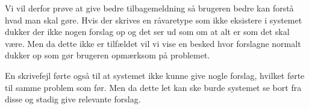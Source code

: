 Vi vil derfor prøve at give bedre tilbagemeldning så brugeren bedre kan forstå hvad man skal gøre. 
Hvis der skrives en råvaretype som ikke eksistere i systemet dukker der ikke nogen forslag op og det ser ud som om at alt er som det skal være.
Men da dette ikke er tilfældet vil vi vise en besked hvor forslagne normalt dukker op som gør brugeren opmærksom på problemet.

En skrivefejl førte også til at systemet ikke kunne give nogle forslag, hvilket førte til samme problem som før. Men da dette let kan ske burde systemet se bort fra disse og stadig give relevante forslag.